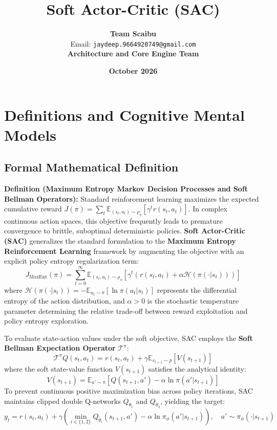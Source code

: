 \documentclass[11pt,a4paper]{article}
\title{\textbf{Soft Actor-Critic (SAC)}}
\author{\textbf{Team Scaibu} \\ \small Email: \texttt{jaydeep.9664920749@gmail.com} \\ \small \textbf{Architecture and Core Engine Team}}
\date{\textbf{October 2026}}
\theoremstyle{definition}
\begin{document}
\maketitle

\section{Definitions and Cognitive Mental Models}

\subsection{Formal Mathematical Definition}
\textbf{Definition (Maximum Entropy Markov Decision Processes and Soft Bellman Operators):}
Standard reinforcement learning maximizes the expected cumulative reward $J(\pi) = \sum_{t} \mathbb{E}_{(s_t, a_t) \sim \rho_\pi} [\gamma^t r(s_t, a_t)]$. In complex continuous action spaces, this objective frequently leads to premature convergence to brittle, suboptimal deterministic policies. \textbf{Soft Actor-Critic (SAC)} generalizes the standard formulation to the \textbf{Maximum Entropy Reinforcement Learning} framework by augmenting the objective with an explicit policy entropy regularization term:
{\boldmath
\begin{equation}
J_{\text{MaxEnt}}(\pi) = \sum_{t=0}^{\infty} \mathbb{E}_{(s_t, a_t) \sim \rho_\pi} \left[ \gamma^t \left( r(s_t, a_t) + \alpha \mathcal{H}(\pi(\cdot | s_t)) \right) \right]
\end{equation}
}
where $\mathcal{H}(\pi(\cdot | s_t)) = -\mathbb{E}_{a_t \sim \pi} \left[ \ln \pi(a_t | s_t) \right]$ represents the differential entropy of the action distribution, and $\alpha > 0$ is the stochastic temperature parameter determining the relative trade-off between reward exploitation and policy entropy exploration.

To evaluate state-action values under the soft objective, SAC employs the \textbf{Soft Bellman Expectation Operator} $\mathcal{T}^\pi$:
{\boldmath
\begin{equation}
\mathcal{T}^\pi Q(s_t, a_t) = r(s_t, a_t) + \gamma \mathbb{E}_{s_{t+1} \sim p} \left[ V(s_{t+1}) \right]
\end{equation}
}
where the soft state-value function $V(s_{t+1})$ satisfies the analytical identity:
{\boldmath
\begin{equation}
V(s_{t+1}) = \mathbb{E}_{a' \sim \pi} \left[ Q(s_{t+1}, a') - \alpha \ln \pi(a' | s_{t+1}) \right]
\end{equation}
}
To prevent continuous positive maximization bias across policy iterations, SAC maintains clipped double Q-networks $Q_{\theta_1}$ and $Q_{\theta_2}$, yielding the target:
{\boldmath
\begin{equation}
y_t = r(s_t, a_t) + \gamma \left( \min_{i \in \{1, 2\}} Q_{\bar{\theta}_i}(s_{t+1}, a') - \alpha \ln \pi_\phi(a' | s_{t+1}) \right), \quad a' \sim \pi_\phi(\cdot | s_{t+1})
\end{equation}
}
\end{document}
